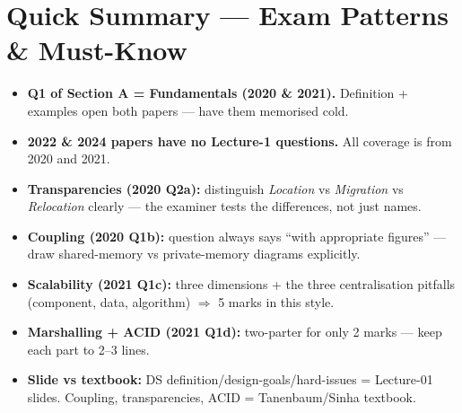 \documentclass[12pt, a4paper]{article}
\newenvironment{notesbox}{\begin{mdframed}[style=notesframe]}{\end{mdframed}}
\begin{document}
\section{Quick Summary — Exam Patterns \& Must-Know}
\begin{notesbox}
\begin{itemize}[leftmargin=1.3cm, itemsep=3pt]
  \item \textbf{Q1 of Section A = Fundamentals (2020 \& 2021).} Definition + examples open both papers — have them memorised cold.
  \item \textbf{2022 \& 2024 papers have no Lecture-1 questions.} All coverage is from 2020 and 2021.
  \item \textbf{Transparencies (2020 Q2a):} distinguish \textit{Location} vs \textit{Migration} vs \textit{Relocation} clearly — the examiner tests the differences, not just names.
  \item \textbf{Coupling (2020 Q1b):} question always says ``with appropriate figures'' — draw shared-memory vs private-memory diagrams explicitly.
  \item \textbf{Scalability (2021 Q1c):} three dimensions + the three centralisation pitfalls (component, data, algorithm) $\Rightarrow$ 5 marks in this style.
  \item \textbf{Marshalling + ACID (2021 Q1d):} two-parter for only 2 marks — keep each part to 2–3 lines.
  \item \textbf{Slide vs textbook:} DS definition/design-goals/hard-issues = Lecture-01 slides. Coupling, transparencies, ACID = Tanenbaum/Sinha textbook.
\end{itemize}
\end{notesbox}
\end{document}
